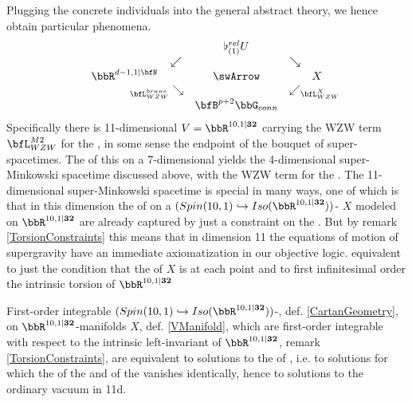 Plugging the concrete individuals into the general abstract theory, we hence obtain particular phenomena.
\begin{displaymath}
\itexarray{
&& \flat^{rel}_{(1)} U
\\
& \swarrow && \searrow
\\
\bbR^{d-1,1|\bfN}
&& \swArrow &&
X
\\
& {}_{\mathllap{\bfL_{WZW}^{brane}}}\searrow && \swarrow_{\mathrlap{\bfL_{WZW}^X}}
\\
&& \bfB^{p+2}\bbG_{conn}
}
\end{displaymath}
Specifically there is 11-dimensional  $V = \bbR^{10,1\vert \mathbf{32}}$ carrying the WZW term $\bfL_{WZW}^{M2}$ for the , in some sense the endpoint of the bouquet of super-spacetimes. The  of this on a 7-dimensional  yields the 4-dimensional super-Minkowski spacetime discussed above, with the WZW term for the .
The 11-dimensional super-Minkowski spacetime is special in many ways, one of which is that in this dimension the  of  on a $(Spin(10,1)\hookrightarrow Iso(\bbR^{10,1\vert \mathbf{32}}))$- $X$ modeled on $\bbR^{10,1\vert \mathbf{32}}$ are already captured by just a constraint on the . But by remark \ref{TorsionConstraints} this means that in dimension 11 the equations of motion of supergravity have an immediate axiomatization in our objective logic.
equivalent to just the condition that the of $X$ is at each point and to first infinitesimal order the intrinsic torsion of $\bbR^{10,1\vert \mathbf{32}}$
\begin{prop}
\label{VacuumSolutionsIn11d}\hypertarget{VacuumSolutionsIn11d}{}
First-order integrable $(Spin(10,1)\hookrightarrow Iso(\bbR^{10,1\vert \mathbf{32}}))$-, def. \ref{CartanGeometry}, on $\bbR^{10,1\vert\mathbf{32}}$-manifolds $X$, def. \ref{VManifold}, which are first-order integrable with respect to the intrinsic left-invariant  of $\bbR^{10,1\vert \mathbf{32}}$, remark \ref{TorsionConstraints}, are equivalent to  solutions to the  of , i.e. to solutions for which the  of the  and of the  vanishes identically, hence to solutions to the ordinary vacuum  in 11d.
\end{prop}
